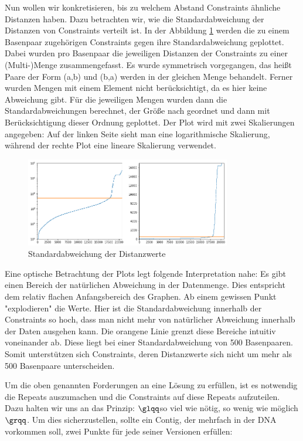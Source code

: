 Nun wollen wir konkretisieren, bis zu welchem Abstand Constraints ähnliche Distanzen haben. Dazu betrachten wir, wie die Standardabweichung der Distanzen von Constraints verteilt ist.
In der Abbildung \ref{std} werden die zu einem Basenpaar zugehörigen Constraints gegen ihre Standardabweichung geplottet. 
Dabei wurden pro Basenpaar die jeweiligen Distanzen der Constraints zu einer (Multi-)Menge zusammengefasst. Es wurde symmetrisch vorgegangen, das heißt Paare der Form (a,b) und (b,a) werden in der gleichen Menge behandelt. Ferner wurden Mengen mit einem Element nicht berücksichtigt, da es hier keine Abweichung gibt. Für die jeweiligen Mengen wurden dann die Standardabweichungen berechnet, der Größe nach geordnet und dann mit Berücksichtigung dieser Ordnung geplottet.
Der Plot wird mit zwei Skalierungen angegeben: Auf der linken Seite sieht man eine logarithmische Skalierung, während der rechte Plot eine lineare Skalierung verwendet.

\begin{figure}
	\begin{center}
		\includegraphics[width=0.8\textwidth]{bilder/std}
	\end{center}
	\caption{Standardabweichung der Distanzwerte}
	\label{std}
\end{figure}




Eine optische Betrachtung der Plots legt folgende Interpretation nahe: 
Es gibt einen Bereich der natürlichen Abweichung in der Datenmenge. Dies entspricht dem relativ flachen Anfangsbereich des Graphen. Ab einem gewissen Punkt "explodieren" die Werte. Hier ist die Standardabweichung innerhalb der Constraints so hoch, dass man nicht mehr von natürlicher Abweichung innerhalb der Daten ausgehen kann. Die orangene Linie grenzt diese Bereiche intuitiv voneinander ab. 
Diese liegt bei einer Standardabweichung von 500 Basenpaaren. 
Somit unterstützen sich Constraints, deren Distanzwerte sich nicht um mehr als 500 Basenpaare unterscheiden.

Um die oben genannten Forderungen an eine Lösung zu erfüllen, ist es notwendig die Repeats auszumachen und die Constraints auf diese Repeats aufzuteilen. Dazu halten wir uns an das Prinzip: $\glqq$so viel wie nötig, so wenig wie möglich$\grqq$.
Um dies sicherzustellen, sollte ein Contig, der mehrfach in der DNA vorkommen soll, zwei Punkte für jede seiner Versionen erfüllen:

